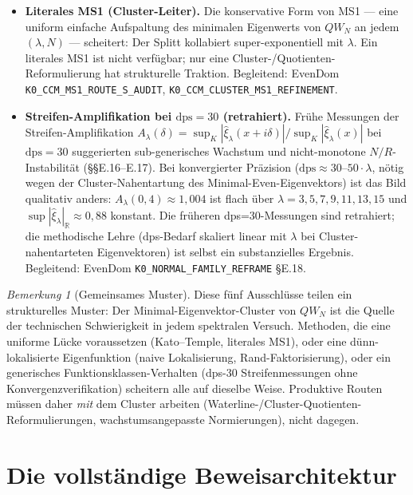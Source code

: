 \documentclass[12pt,a4paper]{article}
\theoremstyle{definition}
\theoremstyle{remark}
\newtheorem{remark}[theorem]{Bemerkung}
\begin{document}
\begin{itemize}
  \item \textbf{Literales MS1 (Cluster-Leiter).} Die konservative Form von MS1 --- eine uniform einfache Aufspaltung des minimalen Eigenwerts von $QW_N$ an jedem $(\lambda,N)$ --- scheitert: Der Splitt kollabiert super-exponentiell mit $\lambda$. Ein literales MS1 ist nicht verfügbar; nur eine Cluster-/Quotienten-Reformulierung hat strukturelle Traktion. Begleitend: EvenDom \texttt{K0\_CCM\_MS1\_ROUTE\_S\_AUDIT}, \texttt{K0\_CCM\_CLUSTER\_MS1\_REFINEMENT}.

  \item \textbf{Streifen-Amplifikation bei $\mathrm{dps}=30$ (retrahiert).} Frühe Messungen der Streifen-Amplifikation $A_\lambda(\delta)=\sup_K|\hat\xi_\lambda(x+i\delta)|/\sup_K|\hat\xi_\lambda(x)|$ bei $\mathrm{dps}=30$ suggerierten sub-generisches Wachstum und nicht-monotone $N/R$-Instabilität (\S\S E.16--E.17). Bei konvergierter Präzision ($\mathrm{dps}\approx 30\text{--}50\cdot\lambda$, nötig wegen der Cluster-Nahentartung des Minimal-Even-Eigenvektors) ist das Bild qualitativ anders: $A_\lambda(0{,}4)\approx 1{,}004$ ist flach über $\lambda=3,5,7,9,11,13,15$ und $\sup|\hat\xi_\lambda|_{\mathbb R}\approx 0{,}88$ konstant. Die früheren dps=30-Messungen sind retrahiert; die methodische Lehre (dps-Bedarf skaliert linear mit $\lambda$ bei Cluster-nahentarteten Eigenvektoren) ist selbst ein substanzielles Ergebnis. Begleitend: EvenDom \texttt{K0\_NORMAL\_FAMILY\_REFRAME} \S E.18.
\end{itemize}

\begin{remark}[Gemeinsames Muster]
Diese fünf Ausschlüsse teilen ein strukturelles Muster: Der Minimal-Eigenvektor-Cluster von $QW_N$ ist die Quelle der technischen Schwierigkeit in jedem spektralen Versuch. Methoden, die eine uniforme Lücke voraussetzen (Kato--Temple, literales MS1), oder eine dünn-lokalisierte Eigenfunktion (naive Lokalisierung, Rand-Faktorisierung), oder ein generisches Funktionsklassen-Verhalten (dps-30 Streifenmessungen ohne Konvergenzverifikation) scheitern alle auf dieselbe Weise. Produktive Routen müssen daher \emph{mit} dem Cluster arbeiten (Waterline-/Cluster-Quotienten-Reformulierungen, wachstumsangepasste Normierungen), nicht dagegen.
\end{remark}


\section{Die vollständige Beweisarchitektur}
\label{sec:architecture}
\end{document}
